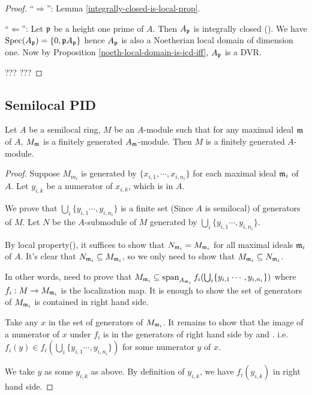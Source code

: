 \begin{proof}
``$\Rightarrow$'': Lemma \ref{integrally-closed-is-local-prop}.

``$\Leftarrow$'': Let ${\mathfrak{p}}$ be a height one prime of $A$.
Then $A_{\mathfrak{p}}$ is integrally closed ().
We have ${\mathrm{Spec}}(A_{\mathfrak{p}})=\{0,{\mathfrak{p}} A_{\mathfrak{p}}\}$ hence
$A_{\mathfrak{p}}$ is also a Noetherian local domain of dimension one.
Now by Proposition \ref{noeth-local-domain-is-icd-iff}, $A_{\mathfrak{p}}$ is a DVR.

??? ???
\end{proof}

\subsection{Semilocal PID}

\begin{lem}
\label{semilocal-fg-mod}
\leanok
Let $A$ be a semilocal ring, $M$ be an $A$-module such that
for any maximal ideal ${\mathfrak{m}}$ of $A$, $M_{\mathfrak{m}}$ is a finitely generated $A_{\mathfrak{m}}$-module.
Then $M$ is a finitely generated $A$-module.
\end{lem}

\begin{proof}
Suppose $M_{m_i}$ is generated by $\{x_{i,1},\cdots, x_{i,n_i}\}$ for each maximal ideal ${\mathfrak{m}}_i$ of $A$.
Let $y_{i,k}$ be a numerator of $x_{i,k}$, which is in $A$.

We prove that $\bigcup_{i}\{y_{i,1} \cdots, y_{i,n_i}\}$
is a finite set (Since $A$ is semilocal) of generators of $M$.
Let $N$ be the $A$-submodule of $M$ generated by $\bigcup_{i}\{y_{i,1} \cdots, y_{i,n_i}\}$.

By local property(), it suffices to show that
$N_{{\mathfrak{m}}_{i}} = M_{{\mathfrak{m}}_{i}}$ for all maximal ideals ${\mathfrak{m}}_i$ of $A$.
It's clear that $N_{{\mathfrak{m}}_{i}} \subseteq  M_{{\mathfrak{m}}_{i}}$, so we only need to show that $M_{{\mathfrak{m}}_{i}} \subseteq  N_{{\mathfrak{m}}_{i}}$.

In other words, need to prove that $M_{{\mathfrak{m}}_{i}} \subseteq 
\operatorname{span}_{A_{{\mathfrak{m}}_i}} f_i (\bigcup_{i}\{y_{i,1} \cdots, y_{i,n_i}\})$ 
where $f_i : M \to M_{{\mathfrak{m}}_i}$ is the localization map.
It is enough to show the set of generators of $M_{{\mathfrak{m}}_{i}}$ is contained in right hand side.

Take any $x$ in the set of generators of $M_{{\mathfrak{m}}_{i}}$.
It remains to show that the image of a numerator of $x$ under $f_i$ 
is in the generators of right hand side by 
 and .
i.e. $f_i(y) \in f_i (\bigcup_{i}\{y_{i,1} \cdots, y_{i,n_i}\})$
for some numerator $y$ of $x$.

We take $y$ as some $y_{i,k}$ as above.
By definition of $y_{i,k}$, we have $f_i(y_{i,k})$ in right hand side.

\end{proof}

